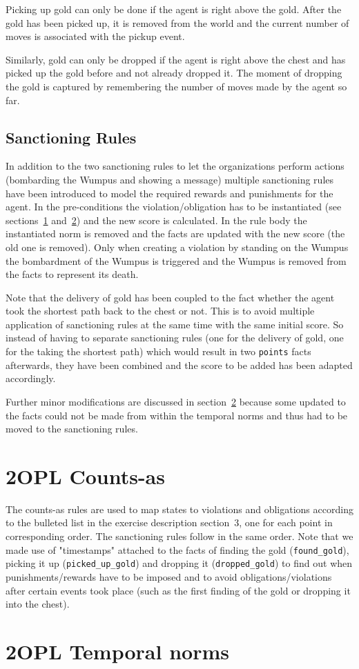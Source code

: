 \documentclass[a4paper,11pt]{article}
\begin{document}
Picking up gold can only be done if the agent is right above the gold. After the gold has been picked up, it is removed from the world and the current number of moves is associated with the pickup event.

Similarly, gold can only be dropped if the agent is right above the chest and has picked up the gold before and not already dropped it. The moment of dropping the gold is captured by remembering the number of moves made by the agent so far.

\subsection{Sanctioning Rules}
\label{sec:sanct}
In addition to the two sanctioning rules to let the organizations perform actions (bombarding the Wumpus and showing a message) multiple sanctioning rules have been introduced to model the required rewards and punishments for the agent. In the pre-conditions the violation/obligation has to be instantiated (see sections~\ref{sec:counts} and~\ref{sec:norms}) and the new score is calculated. In the rule body the instantiated norm is removed and the facts are updated with the new score (the old one is removed). Only when creating a violation by standing on the Wumpus the bombardment of the Wumpus is triggered and the Wumpus is removed from the facts to represent its death.

Note that the delivery of gold has been coupled to the fact whether the agent took the shortest path back to the chest or not. This is to avoid multiple application of sanctioning rules at the same time with the same initial score. So instead of having to separate sanctioning rules (one for the delivery of gold, one for the taking the shortest path) which would result in two \texttt{points} facts afterwards, they have been combined and the score to be added has been adapted accordingly.

Further minor modifications are discussed in section~\ref{sec:norms} because some updated to the facts could not be made from within the temporal norms and thus had to be moved to the sanctioning rules.

\section{2OPL Counts-as}
\label{sec:counts}
The counts-as rules are used to map states to violations and obligations according to the bulleted list in the exercise description section~3, one for each point in corresponding order. The sanctioning rules follow in the same order. Note that we made use of "timestamps" attached to the facts of finding the gold (\texttt{found\_gold}), picking it up (\texttt{picked\_up\_gold}) and dropping it (\texttt{dropped\_gold}) to find out when punishments/rewards have to be imposed and to avoid obligations/violations after certain events took place (such as the first finding of the gold or dropping it into the chest).

\section{2OPL Temporal norms}
\label{sec:norms}
\end{document}
